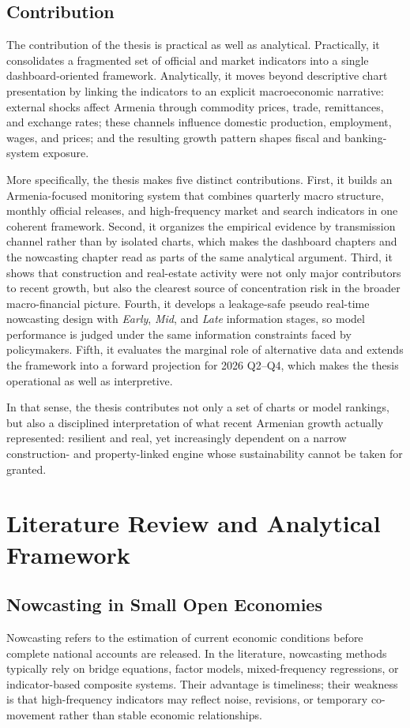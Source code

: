 \documentclass[12pt,a4paper]{report}
\begin{document}
\section{Contribution}
The contribution of the thesis is practical as well as analytical. Practically, it consolidates a fragmented set of official and market indicators into a single dashboard-oriented framework. Analytically, it moves beyond descriptive chart presentation by linking the indicators to an explicit macroeconomic narrative: external shocks affect Armenia through commodity prices, trade, remittances, and exchange rates; these channels influence domestic production, employment, wages, and prices; and the resulting growth pattern shapes fiscal and banking-system exposure.

More specifically, the thesis makes five distinct contributions. First, it builds an Armenia-focused monitoring system that combines quarterly macro structure, monthly official releases, and high-frequency market and search indicators in one coherent framework. Second, it organizes the empirical evidence by transmission channel rather than by isolated charts, which makes the dashboard chapters and the nowcasting chapter read as parts of the same analytical argument. Third, it shows that construction and real-estate activity were not only major contributors to recent growth, but also the clearest source of concentration risk in the broader macro-financial picture. Fourth, it develops a leakage-safe pseudo real-time nowcasting design with \textit{Early}, \textit{Mid}, and \textit{Late} information stages, so model performance is judged under the same information constraints faced by policymakers. Fifth, it evaluates the marginal role of alternative data and extends the framework into a forward projection for 2026 Q2--Q4, which makes the thesis operational as well as interpretive.

In that sense, the thesis contributes not only a set of charts or model rankings, but also a disciplined interpretation of what recent Armenian growth actually represented: resilient and real, yet increasingly dependent on a narrow construction- and property-linked engine whose sustainability cannot be taken for granted.

\chapter{Literature Review and Analytical Framework}
\section{Nowcasting in Small Open Economies}
Nowcasting refers to the estimation of current economic conditions before complete national accounts are released. In the literature, nowcasting methods typically rely on bridge equations, factor models, mixed-frequency regressions, or indicator-based composite systems. Their advantage is timeliness; their weakness is that high-frequency indicators may reflect noise, revisions, or temporary co-movement rather than stable economic relationships.
\end{document}
